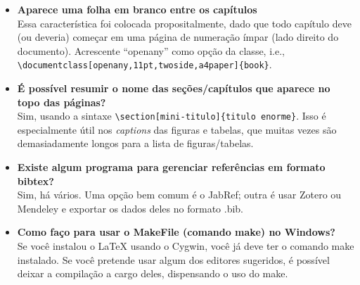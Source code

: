 \begin{itemize}
\item \textbf{Aparece uma folha em branco entre os capítulos}\\
Essa característica foi colocada propositalmente, dado que todo capítulo deve (ou deveria) começar em uma página de numeração ímpar (lado direito do documento). Acrescente ``openany'' como opção da classe, i.e., \texttt{\textbackslash{}documentclass[openany,11pt,twoside,a4paper]\{book\}}.

\item \textbf{É possível resumir o nome das seções/capítulos que aparece no topo das páginas?}\\
	Sim, usando a sintaxe \texttt{\textbackslash{}section[mini-titulo]\{titulo enorme\}}. Isso é especialmente útil nos \textit{captions} das figuras e tabelas, que muitas vezes são demasiadamente longos para a lista de figuras/tabelas.

\item \textbf{Existe algum programa para gerenciar referências em formato bibtex?}\\
Sim, há vários. Uma opção bem comum é o JabRef; outra é usar Zotero ou Mendeley e exportar os dados deles no formato .bib.

\item \textbf{Como faço para usar o MakeFile (comando make) no Windows?}\\
Se você instalou o \LaTeX{} usando o Cygwin, você já deve ter o comando make instalado. Se você pretende usar algum dos editores sugeridos, é possível deixar a compilação a cargo deles, dispensando o uso do make.
\end{itemize}
